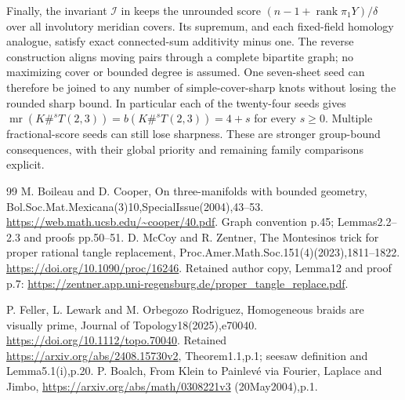 \documentclass[11pt]{article}
\begin{document}
{Finally, the invariant $\mathcal I$ in
 keeps the unrounded score
$(n-1+\operatorname{rank}\pi_1Y)/\delta$ over all involutory
meridian covers. Its supremum, and each fixed-field homology analogue,
satisfy exact connected-sum additivity minus one. The reverse
construction aligns moving pairs through a complete bipartite graph;
no maximizing cover or bounded degree is assumed.
One seven-sheet seed can therefore be joined to any number of
simple-cover-sharp knots without losing the rounded sharp bound.
In particular each of the twenty-four seeds gives
$\operatorname{mr}(K\#^sT(2,3))=b(K\#^sT(2,3))=4+s$ for every
$s\ge0$. Multiple fractional-score seeds can still lose sharpness.
These are stronger group-bound consequences, with their global
priority and remaining family comparisons explicit.

\begin{thebibliography}{99}
 M. Boileau and D. Cooper,
On three-manifolds with bounded geometry,
Bol.Soc.Mat.Mexicana(3)10,SpecialIssue(2004),43--53.
\url{https://web.math.ucsb.edu/~cooper/40.pdf}.
Graph convention p.45; Lemmas2.2--2.3 and proofs pp.50--51.
 D. McCoy and R. Zentner,
The Montesinos trick for proper rational tangle replacement,
Proc.Amer.Math.Soc.151(4)(2023),1811--1822.
\url{https://doi.org/10.1090/proc/16246}.
Retained author copy, Lemma12 and proof p.7:
\url{https://zentner.app.uni-regensburg.de/proper_tangle_replace.pdf}.

 P. Feller, L. Lewark and M. Orbegozo Rodriguez,
Homogeneous braids are visually prime, Journal of Topology18(2025),e70040.
\url{https://doi.org/10.1112/topo.70040}.
Retained \url{https://arxiv.org/abs/2408.15730v2}, Theorem1.1,p.1;
seesaw definition and Lemma5.1(i),p.20.
 P. Boalch,
From Klein to Painlev\'e via Fourier, Laplace and Jimbo,
\url{https://arxiv.org/abs/math/0308221v3} (20May2004),p.1.


\end{thebibliography}}
\end{document}
